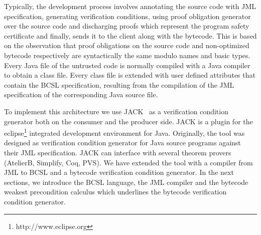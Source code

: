 Typically, the development process involves annotating the source code with JML specification,
 generating verification conditions, using proof obligation generator over the source code and 
discharging proofs which represent the program safety certificate and finally, sends it to the client along with the bytecode.
 This is based on the observation that proof obligations on the source code and non-optimized bytecode respectively
 are syntactically the same modulo names and basic types. Every Java file of the 
untrusted code is normally compiled with a Java compiler to obtain a class file. Every class file is extended with
 user defined attributes that contain the BCSL specification, resulting from the compilation of the
 JML specification of the corresponding Java source file.



    





To implement this architecture we use JACK~\cite{BRL-JACK} as a verification condition generator both on the consumer and the
producer side. JACK is a plugin for the eclipse\footnote{http://www.eclipse.org} integrated development environment for Java.
 Originally, the tool was designed as verification condition generator for Java source programs against their JML specification.
 JACK can interface with several theorem provers (AtelierB, Simplify, Coq, PVS). We have extended the tool with a compiler from
 JML to BCSL and a bytecode verification condition generator. In the next sections, we introduce
 the BCSL language, the JML compiler and the bytecode weakest precondition calculus which underlines the bytecode verification condition generator.
 
